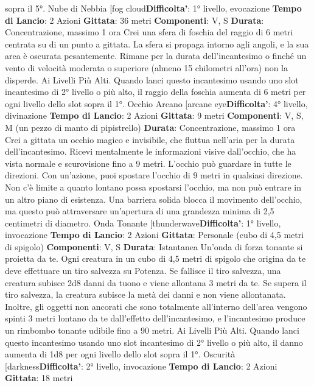 \begin{multicols}{2}
sopra il 5°.
Nube di Nebbia
[fog cloud\textbf{Difficolta'}:
1° livello, evocazione
\textbf{Tempo di Lancio}: 2 Azioni
\textbf{Gittata}: 36 metri
\textbf{Componenti}: V, S
\textbf{Durata}: Concentrazione, massimo 1 ora
Crei una sfera di foschia del raggio di 6 metri centrata
su di un punto a gittata. La sfera si propaga intorno agli
angoli, e la sua area è oscurata pesantemente. Rimane
per la durata dell’incantesimo o finché un vento di
velocità moderata o superiore (almeno 15 chilometri
all’ora) non la disperde.
Ai Livelli Più Alti. Quando lanci questo incantesimo
usando uno slot incantesimo di 2° livello o più alto, il
raggio della foschia aumenta di 6 metri per ogni livello
dello slot sopra il 1°.
Occhio Arcano
[arcane eye\textbf{Difficolta'}:
4° livello, divinazione
\textbf{Tempo di Lancio}: 2 Azioni
\textbf{Gittata}: 9 metri
\textbf{Componenti}: V, S, M (un pezzo di manto di pipistrello)
\textbf{Durata}: Concentrazione, massimo 1 ora
Crei a gittata un occhio magico e invisibile, che fluttua
nell’aria per la durata dell’incantesimo.
Ricevi mentalmente le informazioni visive dall’occhio,
che ha vista normale e scurovisione fino a 9 metri.
L’occhio può guardare in tutte le direzioni.
Con un’azione, puoi spostare l’occhio di 9 metri in
qualsiasi direzione. Non c’è limite a quanto lontano
possa spostarsi l’occhio, ma non può entrare in un altro
piano di esistenza. Una barriera solida blocca il
movimento dell’occhio, ma questo può attraversare
un’apertura di una grandezza minima di 2,5 centimetri
di diametro.
Onda Tonante
[thunderwave\textbf{Difficolta'}:
1° livello, invocazione
\textbf{Tempo di Lancio}: 2 Azioni
\textbf{Gittata}: Personale (cubo di 4,5 metri di spigolo)
\textbf{Componenti}: V, S
\textbf{Durata}: Istantanea
Un’onda di forza tonante si proietta da te. Ogni creatura
in un cubo di 4,5 metri di spigolo che origina da te deve
effettuare un tiro salvezza su Potenza. Se fallisce il
tiro salvezza, una creatura subisce 2d8 danni da tuono
e viene allontana 3 metri da te. Se supera il tiro
salvezza, la creatura subisce la metà dei danni e non
viene allontanata.
Inoltre, gli oggetti non ancorati che sono totalmente
all’interno dell’area vengono spinti 3 metri lontano da te
dall’effetto dell’incantesimo, e l’incantesimo produce un
rimbombo tonante udibile fino a 90 metri.
Ai Livelli Più Alti. Quando lanci questo incantesimo
usando uno slot incantesimo di 2° livello o più alto, il
danno aumenta di 1d8 per ogni livello dello slot sopra il
1°.
Oscurità
[darkness\textbf{Difficolta'}:
2° livello, invocazione
\textbf{Tempo di Lancio}: 2 Azioni
\textbf{Gittata}: 18 metri

\end{multicols}
